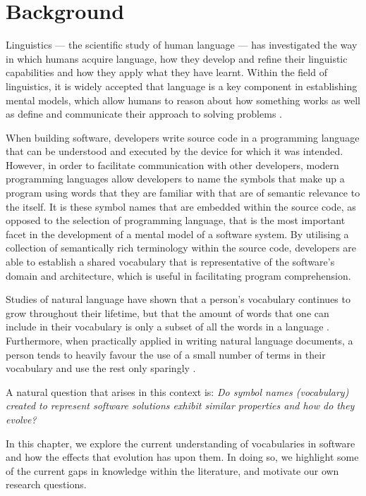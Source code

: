 \chapter{Background}
\label{cha:background}

Linguistics --- the scientific study of human language --- has investigated the way in which humans acquire language, how they develop and refine their linguistic capabilities and how they apply what they have learnt. Within the field of linguistics, it is widely accepted that language is a key component in establishing mental models, which allow humans to reason about how something works as well as define and communicate their approach to solving problems \cite{Johnson86a}.

When building software, developers write source code in a programming language that can be understood and executed by the device for which it was intended. However, in order to facilitate communication with other developers, modern programming languages allow developers to name the symbols that make up a program using words that they are familiar with that are of semantic relevance to the itself. It is these symbol names that are embedded within the source code, as opposed to the selection of programming language, that is the most important facet in the development of a mental model of a software system. By utilising a collection of semantically rich terminology within the source code, developers are able to establish a shared vocabulary that is representative of the software's domain and architecture, which is useful in facilitating program comprehension.

Studies of natural language have shown that a person's vocabulary continues to grow throughout their lifetime, but that the amount of words that one can include in their vocabulary is only a subset of all the words in a language \cite{Nation93a}. Furthermore, when practically applied in writing natural language documents, a person tends to heavily favour the use of a small number of terms in their vocabulary and use the rest only sparingly \cite{Zipf49a}.

A natural question that arises in this context is: \emph{Do symbol names (vocabulary) created to represent software solutions exhibit similar properties and how do they evolve?}

In this chapter, we explore the current understanding of vocabularies in software and how the effects that evolution has upon them. In doing so, we highlight some of the current gaps in knowledge within the literature, and motivate our own research questions.

